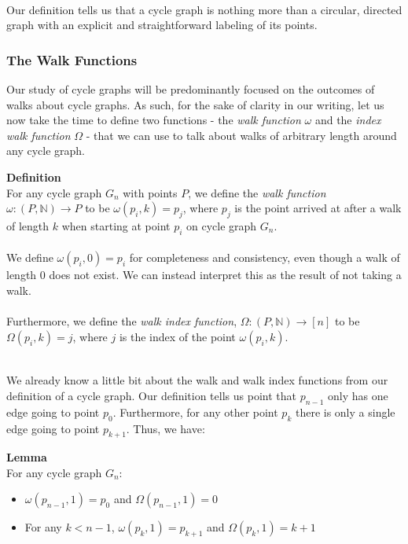 \documentclass[a4paper,12pt]{article}
\begin{document}
\noindent
\\
Our definition tells us that a cycle graph is nothing more than a circular, directed graph with an explicit and straightforward labeling of its points.


\subsubsection{The Walk Functions}

Our study of cycle graphs will be predominantly focused on the outcomes of walks about cycle graphs. As such, for the sake of clarity in our writing, let us now take the time to define two functions - the \textit{walk function} $\omega$ and the \textit{index walk function} $\Omega$ - that we can use to talk about walks of arbitrary length around any cycle graph.\\

\label{definition:walk_functions}
\begin{tcolorbox}
\textbf{Definition}\\
For any cycle graph $G_n$ with points $P$, we define the \textit{walk function} $\omega: (P, \mathbb{N}) \rightarrow P$ to be $\omega(p_i, k) = p_j$, where $p_j$ is the point arrived at after a walk of length $k$ when starting at point $p_i$ on cycle graph $G_n$.\\
\\
We define $\omega(p_i, 0) = p_i$ for completeness and consistency, even though a walk of length $0$ does not exist. We can instead interpret this as the result of not taking a walk.\\
\\
Furthermore, we define the \textit{walk index function}, $\Omega: (P, \mathbb{N}) \rightarrow [n]$ to be $\Omega(p_i, k) = j$, where $j$ is the index of the point $\omega(p_i, k)$.
\end{tcolorbox}


\noindent
\\
We already know a little bit about the walk and walk index functions from our definition of a cycle graph. Our definition tells us point that $p_{n-1}$ only has one edge going to point $p_0$. Furthermore, for any other point $p_k$ there is only a single edge going to point $p_{k+1}$. Thus, we have:\\


\label{lemma:walk_1}
\begin{tcolorbox}
\textbf{Lemma}\\
For any cycle graph $G_n$:
\begin{itemize}
\item $\omega(p_{n-1}, 1) = p_0$ and $\Omega(p_{n-1}, 1) = 0$
\item For any $k < n - 1$, $\omega(p_k, 1) = p_{k+1}$ and $\Omega(p_k, 1) = k + 1$
\end{itemize}
\end{tcolorbox}
\end{document}

